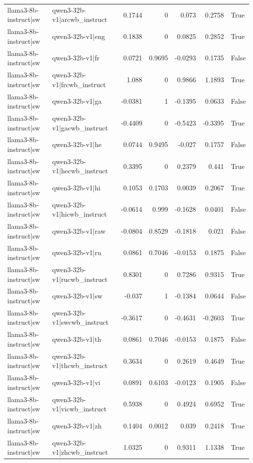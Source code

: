 \begin{table}
\begin{tabular}{l l r r r r l}
llama3-8b-instruct|sw & qwen3-32b-v1|arcwb_instruct & 0.1744 & 0 & 0.073 & 0.2758 & True \\
llama3-8b-instruct|sw & qwen3-32b-v1|eng & 0.1838 & 0 & 0.0825 & 0.2852 & True \\
llama3-8b-instruct|sw & qwen3-32b-v1|fr & 0.0721 & 0.9695 & -0.0293 & 0.1735 & False \\
llama3-8b-instruct|sw & qwen3-32b-v1|frcwb_instruct & 1.088 & 0 & 0.9866 & 1.1893 & True \\
llama3-8b-instruct|sw & qwen3-32b-v1|ga & -0.0381 & 1 & -0.1395 & 0.0633 & False \\
llama3-8b-instruct|sw & qwen3-32b-v1|gacwb_instruct & -0.4409 & 0 & -0.5423 & -0.3395 & True \\
llama3-8b-instruct|sw & qwen3-32b-v1|he & 0.0744 & 0.9495 & -0.027 & 0.1757 & False \\
llama3-8b-instruct|sw & qwen3-32b-v1|hecwb_instruct & 0.3395 & 0 & 0.2379 & 0.441 & True \\
llama3-8b-instruct|sw & qwen3-32b-v1|hi & 0.1053 & 0.1703 & 0.0039 & 0.2067 & True \\
llama3-8b-instruct|sw & qwen3-32b-v1|hicwb_instruct & -0.0614 & 0.999 & -0.1628 & 0.0401 & False \\
llama3-8b-instruct|sw & qwen3-32b-v1|raw & -0.0804 & 0.8529 & -0.1818 & 0.021 & False \\
llama3-8b-instruct|sw & qwen3-32b-v1|ru & 0.0861 & 0.7046 & -0.0153 & 0.1875 & False \\
llama3-8b-instruct|sw & qwen3-32b-v1|rucwb_instruct & 0.8301 & 0 & 0.7286 & 0.9315 & True \\
llama3-8b-instruct|sw & qwen3-32b-v1|sw & -0.037 & 1 & -0.1384 & 0.0644 & False \\
llama3-8b-instruct|sw & qwen3-32b-v1|swcwb_instruct & -0.3617 & 0 & -0.4631 & -0.2603 & True \\
llama3-8b-instruct|sw & qwen3-32b-v1|th & 0.0861 & 0.7046 & -0.0153 & 0.1875 & False \\
llama3-8b-instruct|sw & qwen3-32b-v1|thcwb_instruct & 0.3634 & 0 & 0.2619 & 0.4649 & True \\
llama3-8b-instruct|sw & qwen3-32b-v1|vi & 0.0891 & 0.6103 & -0.0123 & 0.1905 & False \\
llama3-8b-instruct|sw & qwen3-32b-v1|vicwb_instruct & 0.5938 & 0 & 0.4924 & 0.6952 & True \\
llama3-8b-instruct|sw & qwen3-32b-v1|zh & 0.1404 & 0.0012 & 0.039 & 0.2418 & True \\
llama3-8b-instruct|sw & qwen3-32b-v1|zhcwb_instruct & 1.0325 & 0 & 0.9311 & 1.1338 & True \\

\end{tabular}
\end{table}
